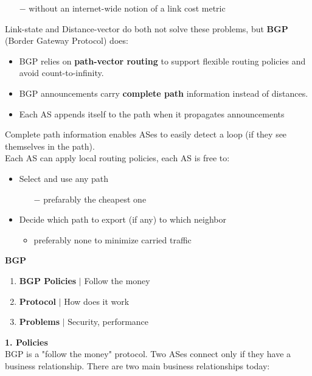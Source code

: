 \documentclass[a4paper, fontsize=8pt, landscape, DIV=1]{scrartcl}
\begin{document}
\begin{multicols*}{4}
\begin{itemize}[noitemsep]
\begin{itemize}
				\item[$-$] without an internet-wide notion of a link cost metric
			\end{itemize}		
		\end{itemize}
		Link-state and Distance-vector do both not solve these problems, but
		\textbf{BGP} (Border Gateway Protocol) does:
		\begin{itemize}[noitemsep]
			\item BGP relies on \textbf{path-vector routing} to support flexible routing
			policies and avoid count-to-infinity.
			\item BGP announcements carry \textbf{complete path} information instead of
			distances.
			\item Each AS appends itself to the path when it propagates announcements
		\end{itemize}
		Complete path information enables ASes to easily detect a loop (if they see
		themselves in the path).\\
		Each AS can apply local routing policies, each AS is free to: 
		\begin{itemize}[noitemsep]
			\item Select and use any path
			\begin{itemize}
				\item[$-$]prefarably the cheapest one
			\end{itemize}
			\item Decide which path to export (if any) to which neighbor 
			\begin{itemize}
				\item preferably none to minimize carried traffic
			\end{itemize}
		\end{itemize}
		\textbf{BGP}
		\vspace{-0.2cm}
		\begin{enumerate}[noitemsep]
			\item \textbf{BGP Policies} $\vert$ Follow the money
			\item \textbf{Protocol} $\vert$ How does it work
			\item \textbf{Problems} $\vert$ Security, performance 
		\end{enumerate}
		\textbf{1. Policies}\\
		BGP is a "follow the money" protocol. Two ASes connect only if they have a
		business relationship. There are two main business relationships today: 

\end{multicols*}
\end{document}
